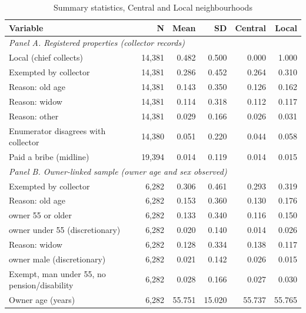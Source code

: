 \begin{table}[!htbp]\centering\footnotesize
\caption{Summary statistics, Central and Local neighbourhoods}\label{tab:sumstats}
\begin{threeparttable}
\begin{tabular}{lrrrrr}
\toprule
Variable & N & Mean & SD & Central & Local \\
\midrule
\multicolumn{6}{l}{\textit{Panel A. Registered properties (collector records)}} \\
Local (chief collects) & 14,381 & 0.482 & 0.500 & 0.000 & 1.000 \\
Exempted by collector & 14,381 & 0.286 & 0.452 & 0.264 & 0.310 \\
\hspace{1em}Reason: old age & 14,381 & 0.143 & 0.350 & 0.126 & 0.162 \\
\hspace{1em}Reason: widow & 14,381 & 0.114 & 0.318 & 0.112 & 0.117 \\
\hspace{1em}Reason: other & 14,381 & 0.029 & 0.166 & 0.026 & 0.031 \\
Enumerator disagrees with collector & 14,380 & 0.051 & 0.220 & 0.044 & 0.058 \\
Paid a bribe (midline) & 19,394 & 0.014 & 0.119 & 0.014 & 0.015 \\
\midrule
\multicolumn{6}{l}{\textit{Panel B. Owner-linked sample (owner age and sex observed)}} \\
Exempted by collector & 6,282 & 0.306 & 0.461 & 0.293 & 0.319 \\
\hspace{1em}Reason: old age & 6,282 & 0.153 & 0.360 & 0.130 & 0.176 \\
\hspace{2em}owner 55 or older & 6,282 & 0.133 & 0.340 & 0.116 & 0.150 \\
\hspace{2em}owner under 55 (discretionary) & 6,282 & 0.020 & 0.140 & 0.014 & 0.026 \\
\hspace{1em}Reason: widow & 6,282 & 0.128 & 0.334 & 0.138 & 0.117 \\
\hspace{2em}owner male (discretionary) & 6,282 & 0.021 & 0.142 & 0.026 & 0.015 \\
Exempt, man under 55, no pension/disability & 6,282 & 0.028 & 0.166 & 0.027 & 0.030 \\
Owner age (years) & 6,282 & 55.751 & 15.020 & 55.737 & 55.765 \\

\end{tabular}
\end{threeparttable}
\end{table}
